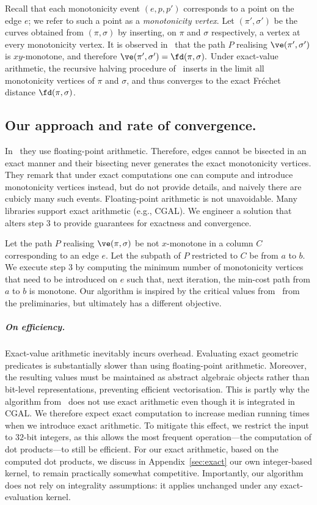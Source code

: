 \documentclass[english, thm-restate, notab]{lipics-v2021}
\begin{document}
Recall that each monotonicity event $(e,p,p')$ corresponds to a point on the edge $e$; we refer to such a point as a \emph{monotonicity vertex}.  
Let $(\pi',\sigma')$ be the curves obtained from $(\pi,\sigma)$ by inserting, on $\pi$ and $\sigma$ respectively, a vertex at every monotonicity vertex.
It is observed in~\cite{harpeled_et_al:LIPIcs.SoCG.2025.54} that the path $P$ realising $\ve(\pi',\sigma')$ is $xy$-monotone, and therefore $
  \ve(\pi',\sigma') = \fd(\pi,\sigma).$
Under exact-value arithmetic, the recursive halving procedure of~\cite{harpeled_et_al:LIPIcs.SoCG.2025.54} inserts in the limit all monotonicity vertices of $\pi$ and $\sigma$, and thus converges to the exact Fréchet distance $\fd(\pi,\sigma)$.


\subsection{Our approach and rate of convergence.}

In~\cite{harpeled_et_al:LIPIcs.SoCG.2025.54} they use floating-point arithmetic. 
Therefore,  edges cannot be bisected in an exact manner and their bisecting never generates the exact monotonicity vertices. 
They remark that under exact computations one can compute and introduce monotonicity vertices instead, but do not provide details, and naively there are cubicly many such events. 
Floating-point arithmetic is not unavoidable. Many libraries support exact arithmetic (e.g., CGAL). We engineer a solution that alters step 3 to provide guarantees for exactness and convergence. 

Let the path $P$ realising $\ve(\pi, \sigma)$ be not $x$-monotone in a column $C$ corresponding to an edge $e$. 
Let the subpath of $P$ restricted to $C$ be from $a$ to $b$. We execute step 3 by computing the minimum number of monotonicity vertices that need to be introduced on $e$ such that, next iteration, the min-cost path from  $a$ to $b$ is monotone.
Our algorithm is inspired by the critical values from~\cite{alt1995computing, HarPeled2011Frechet} from the preliminaries, but ultimately has a different objective.

\subparagraph{On efficiency.}
Exact-value arithmetic inevitably incurs overhead.  
Evaluating exact geometric predicates is substantially slower than using floating-point arithmetic. Moreover, the resulting values must be maintained as abstract algebraic objects rather than bit-level representations, preventing efficient vectorisation. This is partly why the algorithm from~\cite{bringmann2019Walking} does not use exact arithmetic even though it is integrated in CGAL. 
We therefore expect exact computation to increase median running times when we introduce exact arithmetic. 
To mitigate this effect, we restrict the input to $32$-bit integers, as this allows the most frequent operation---the computation of dot products---to still be efficient. For our exact arithmetic, based on the computed dot products, we discuss in Appendix~\ref{sec:exact} our own integer-based kernel, to remain practically somewhat competitive. 
Importantly, our algorithm does not rely on integrality assumptions: it applies unchanged under any exact-evaluation kernel.
\end{document}

